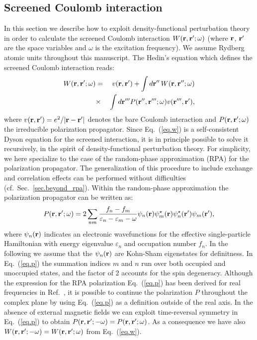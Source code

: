 \documentclass[twocolumn,prb,showpacs,superscriptaddress]{revtex4}
\def\w{\omega}
\def\E{\varepsilon}
\def\r{{\bf r}}
\def\rp{{\bf r^\prime}}
\def\rpp{{\bf r^{\prime\prime}}}
\def\rppp{{\bf r^{\prime\prime\prime}}}
\begin{document}
\subsection{Screened Coulomb interaction}\label{sec.coulomb}

In this section we describe how to exploit density-functional
perturbation theory in order to calculate the screened Coulomb interaction
$W(\r,\rp;\w)$ (where $\r$, $\rp$ are the space variables and $\w$ is the
excitation frequency). We assume Rydberg atomic units throughout this manuscript. 
The Hedin's equation which defines the screened Coulomb 
interaction reads:\cite{hl}
  \begin{eqnarray}\label{eq.w}
  W(\r,\rp;\w) & = & v(\r,\rp) + \int d\rpp \,W(\r,\rpp;\w)  \nonumber \\
   & \times & \int d\rppp P(\rpp,\rppp;\w) v(\rppp,\rp),
  \end{eqnarray}
where $v(\r,\rp)=e^2/|\r-\rp|$ denotes the bare Coulomb interaction and 
$P(\r,\rp;\w)$ the irreducible polarization propagator. 
Since Eq.\ (\ref{eq.w}) is a self-consistent Dyson equation for the
screened interaction, it is in principle possible to solve it
recursively, in the spirit of density-functional perturbation theory.
For simplicity, we here specialize to the case of the random-phase approximation (RPA)
for the polarization propagator. 
The generalization of this procedure to include exchange and correlation
effects can be performed without difficulties (cf.\ Sec.\ \ref{sec.beyond_rpa}).
Within the random-phase approximation the polarization propagator can be written as:\cite{hl}
  \begin{equation}\label{eq.p}
  P(\r,\rp;\w) = 2\sum_{n m} \frac{f_n-f_m}{\E_n-\E_m-\w} 
  \psi_n(\r)\psi_m^\star(\r)  \psi_n^\star(\rp)\psi_m(\rp),
  \end{equation}
where $\psi_n(\r)$ indicates an electronic wavefunctions for the
effective single-particle Hamiltonian 
with energy eigenvalue $\E_n$ and occupation number $f_n$. 
In the following we assume that the $\psi_n(\r)$ are Kohn-Sham
eigenstates for definitness.
In Eq.\ (\ref{eq.p}) the summation indices $m$ and $n$ run over
both occupied and unoccupied states, and the factor of 2 accounts for the
spin degeneracy.\cite{hl}
Although the expression for the RPA polarization Eq.~(\ref{eq.p})
has been derived for real frequencies in Ref.\ , it
is possible to continue the polarization $P$ throughout the complex 
plane by using Eq.~(\ref{eq.p}) as a definition outside of the real axis.
In the absence of external magnetic fields we can exploit time-reversal 
symmetry in Eq.\ (\ref{eq.p}) to obtain $P(\r,\rp;-\w)=P(\r,\rp;\w)$.
As a consequence we have also $W(\r,\rp;-\w)=W(\r,\rp;\w)$ from Eq.\ (\ref{eq.w}).
\end{document}
